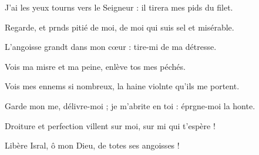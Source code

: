 \item J’ai les yeux tourns vers le Seigneur :\psstar{} il tirera mes pids du filet.
\item Regarde, et prnds pitié de moi,\psstar{} de moi qui suis sel et misérable.
\item L’angoisse grandt dans mon cœur :\psstar{} tire-mi de ma détresse.
\item Vois ma misre et ma peine,\psstar{} enlève tos mes péchés.
\item Vois mes ennems si nombreux,\psstar{} la haine violnte qu’ils me portent.
\item Garde mon me, délivre-moi ;\psstar{} je m’abrite en toi : éprgne-moi la honte.
\item Droiture et perfection villent sur moi,\psstar{} sur mi qui t’espère !
\item Libère Isral, ô mon Dieu,\psstar{} de totes ses angoisses !